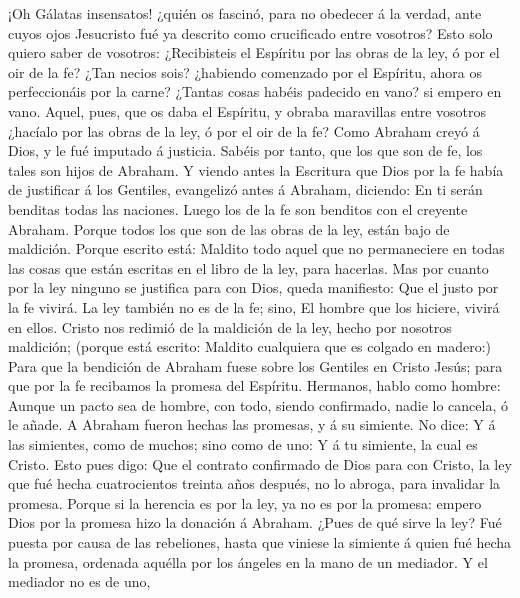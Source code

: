  ¡Oh Gálatas insensatos! ¿quién os fascinó, para no
obedecer á la verdad, ante cuyos ojos Jesucristo fué ya descrito como
crucificado entre vosotros?  Esto solo quiero saber de
vosotros: ¿Recibisteis el Espíritu por las obras de la ley, ó por el oir
de la fe?  ¿Tan necios sois? ¿habiendo comenzado por el
Espíritu, ahora os perfeccionáis por la carne?  ¿Tantas
cosas habéis padecido en vano? si empero en vano.  Aquel,
pues, que os daba el Espíritu, y obraba maravillas entre vosotros
¿hacíalo por las obras de la ley, ó por el oir de la fe? 
Como Abraham creyó á Dios, y le fué imputado á justicia. 
Sabéis por tanto, que los que son de fe, los tales son hijos de Abraham.
 Y viendo antes la Escritura que Dios por la fe había de
justificar á los Gentiles, evangelizó antes á Abraham, diciendo: En ti
serán benditas todas las naciones.  Luego los de la fe son
benditos con el creyente Abraham.  Porque todos los que
son de las obras de la ley, están bajo de maldición. Porque escrito
está: Maldito todo aquel que no permaneciere en todas las cosas que
están escritas en el libro de la ley, para hacerlas.  Mas
por cuanto por la ley ninguno se justifica para con Dios, queda
manifiesto: Que el justo por la fe vivirá.  La ley
también no es de la fe; sino, El hombre que los hiciere, vivirá en
ellos.  Cristo nos redimió de la maldición de la ley,
hecho por nosotros maldición; (porque está escrito: Maldito cualquiera
que es colgado en madero:)  Para que la bendición de
Abraham fuese sobre los Gentiles en Cristo Jesús; para que por la fe
recibamos la promesa del Espíritu.  Hermanos, hablo como
hombre: Aunque un pacto sea de hombre, con todo, siendo confirmado,
nadie lo cancela, ó le añade.  A Abraham fueron hechas
las promesas, y á su simiente. No dice: Y á las simientes, como de
muchos; sino como de uno: Y á tu simiente, la cual es Cristo.
 Esto pues digo: Que el contrato confirmado de Dios para
con Cristo, la ley que fué hecha cuatrocientos treinta años después, no
lo abroga, para invalidar la promesa.  Porque si la
herencia es por la ley, ya no es por la promesa: empero Dios por la
promesa hizo la donación á Abraham.  ¿Pues de qué sirve
la ley? Fué puesta por causa de las rebeliones, hasta que viniese la
simiente á quien fué hecha la promesa, ordenada aquélla por los ángeles
en la mano de un mediador.  Y el mediador no es de uno,
